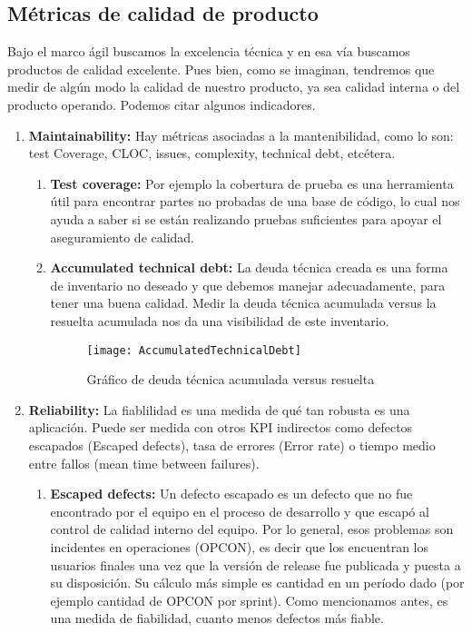 \subsection{Métricas de calidad de producto}

Bajo el marco ágil buscamos la excelencia técnica y en esa vía buscamos productos de calidad excelente. Pues bien, como se imaginan, tendremos que medir de algún modo la calidad de nuestro producto, ya sea calidad interna o del producto operando. Podemos citar algunos indicadores.

  \begin{enumerate}    

  \item {\textbf{Maintainability:} Hay métricas asociadas a la mantenibilidad, como lo son: test Coverage, CLOC, issues, complexity, technical debt, etcétera. 
  
    \begin{enumerate}    
    \item {\textbf{Test coverage:}
Por ejemplo la cobertura de prueba es una herramienta útil para encontrar partes no probadas de una base de código, lo cual nos ayuda a saber si se están realizando pruebas suficientes para apoyar el aseguramiento de calidad.
}
    \item {\textbf{Accumulated technical debt:}
La deuda técnica creada es una forma de inventario no deseado y que debemos manejar adecuadamente, para tener una buena calidad. Medir la deuda técnica acumulada versus la resuelta acumulada nos da una visibilidad de este inventario.
}

  \begin{figure}[h]
  \centering
  \texttt{[image: AccumulatedTechnicalDebt]}
  \caption{Gráfico de deuda técnica acumulada versus resuelta}
  \centering
  \label{fig:AccumulatedTechnicalDebt} %
  \end{figure}
  \FloatBarrier

  \end{enumerate}
}

  \item {\textbf{Reliability:} La fiablilidad es una medida de qué tan robusta es una aplicación. Puede ser medida con otros KPI indirectos como defectos escapados (Escaped defects), tasa de errores (Error rate) o tiempo medio entre fallos (mean time between failures).
  
  \begin{enumerate}    
    \item {\textbf{Escaped defects:}
Un defecto escapado es un defecto que no fue encontrado por el equipo en el proceso de desarrollo y que escapó al control de calidad interno del equipo. Por lo general, esos problemas son incidentes en operaciones (OPCON), es decir que los encuentran los usuarios finales una vez que la versión de release fue publicada y puesta a su disposición. Su cálculo más simple es cantidad en un período dado (por ejemplo cantidad de OPCON por sprint). Como mencionamos antes, es una medida de fiabilidad, cuanto menos defectos más fiable.
}
  \end{enumerate}
  }



\end{enumerate}
